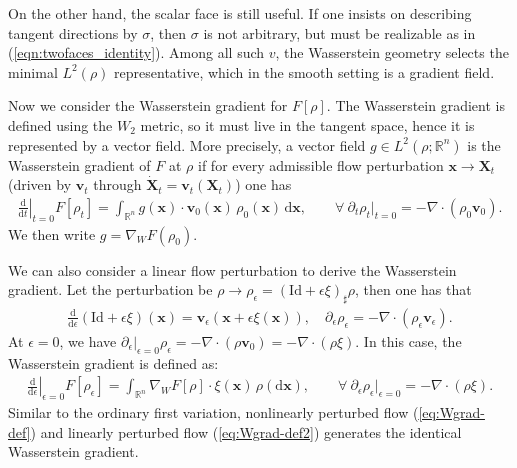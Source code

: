 \documentclass[11pt]{book}
\newcommand{\reff}[1]{{\rm (\ref{#1})}}
\newcommand{\R}{\mathbb{R}}
\newcommand{\bx}{\mathbf x}
\newcommand{\bX}{\mathbf X}
\newcommand{\bv}{\mathbf v}
\newcommand{\dd}{\mathrm{d}}
\begin{document}
On the other hand, the scalar face is still useful. If one insists on describing tangent directions by $\sigma$, then $\sigma$ is not arbitrary, but must be realizable as in \reff{eqn:twofaces_identity}. Among all such $v$, the Wasserstein geometry selects the minimal $L^2(\rho)$ representative, which in the smooth setting is a gradient field.


Now we consider the Wasserstein gradient for $F[\rho]$. The Wasserstein gradient is defined using the $W_2$ metric, so it must live in the tangent space, hence it is represented by a vector field. More precisely, a vector field $g\in L^2(\rho;\R^n)$ is the Wasserstein gradient of $F$ at $\rho$ if for every admissible flow perturbation $\bx \rightarrow \bX_t$ (driven by $\bv_t$ through $\dot{\bX}_t = \bv_t(\bX_t)$) one has
\begin{align}\label{eq:Wgrad-def}
\left.\frac{\dd}{\dd t}\right|_{t=0} F[\rho_t]
= \int_{\R^n} g(\bx)\cdot \bv_0(\bx)\,\rho_0(\bx)\,\dd \bx,
\qquad \forall \  \partial_t\rho_t|_{t=0}=-\nabla\cdot(\rho_0 \bv_0).
\end{align}
We then write $g = \nabla_W F(\rho_0)$.

We can also consider a linear flow perturbation to derive the Wasserstein gradient. Let the perturbation be $\rho \rightarrow \rho_{\epsilon} =  (\mathrm{Id} + \epsilon \xi)_{\sharp}\rho$, then one has that 
\begin{align*}
    \frac{\dd}{\dd \epsilon}(\mathrm{Id} + \epsilon \xi)(\bx) = \bv_{\epsilon}(\bx + \epsilon \xi(\bx)), \quad \partial_{\epsilon} \rho_{\epsilon} = -\nabla\cdot(\rho_{\epsilon}\bv_{\epsilon}).
\end{align*}
At $\epsilon = 0$, we have $\partial_{\epsilon}|_{\epsilon = 0} \rho_{\epsilon} = -\nabla\cdot(\rho \bv_0) = -\nabla\cdot(\rho \xi)$. In this case, the Wasserstein gradient is defined as:
\begin{align}\label{eq:Wgrad-def2}
    \left.\frac{\dd}{\dd \epsilon}\right|_{\epsilon=0} F[\rho_{\epsilon}]
    = \int_{\R^n} \nabla_W F[\rho]\cdot \xi(\bx)\,\rho(\dd \bx),
    \qquad \forall \  \partial_{\epsilon}\rho_\epsilon|_{\epsilon=0}=-\nabla\cdot(\rho \xi).   
\end{align}
Similar to the ordinary first variation, nonlinearly perturbed flow \reff{eq:Wgrad-def} and linearly perturbed flow \reff{eq:Wgrad-def2} generates the identical Wasserstein gradient.
\end{document}

